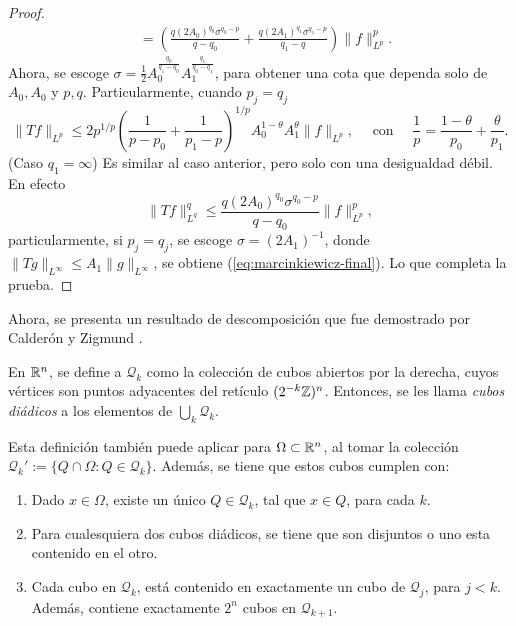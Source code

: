 \begin{proof}
\begin{align*}
		& = \left(\frac{q(2A_0)^{q_0}\sigma^{q_0-p}}{q-q_0} +\frac{q(2A_1)^{q_1}\sigma^{q_1-p}}{q_1-q} \right) \|f\|_{L^p}^p.
	\end{align*}
	Ahora, se escoge $\sigma=\frac{1}{2}A_0^{\frac{q_0}{q_1-q_0}}A_1^{\frac{q_1}{q_0-q_1}}$, para obtener una cota que dependa solo de $A_0,A_0$ y $p,q$. Particularmente, cuando $p_j =q_j$
	\begin{equation}\label{eq:marcinkiewicz-final}
		\|Tf\|_{L^p} \leq 2p^{1/p}\left(\frac{1}{p-p_0}+\frac{1}{p_1-p}\right)^{1/p}A_0^{1-\theta}A_1^\theta\|f\|_{L^p}, \quad \text{ con }\quad \frac{1}{p} = \frac{1-\theta}{p_0} + \frac{\theta}{p_1}.
	\end{equation}
	(Caso $q_1=\infty$) Es similar al caso anterior, pero solo con una desigualdad débil. En efecto 
	\begin{equation*}
		\|Tf\|_{L^q}^q \leq \frac{q(2A_0)^{q_0}\sigma^{q_0-p}}{q-q_0} \|f\|_{L^p}^p,
	\end{equation*}
	particularmente, si $p_j=q_j$, se escoge $\sigma = (2A_1)^{-1}$, donde $\|Tg\|_{L^\infty}\leq A_1\|g\|_{L^\infty}$, se obtiene (\ref{eq:marcinkiewicz-final}). Lo que completa la prueba.
\end{proof}
Ahora, se presenta un resultado de descomposición que fue demostrado por Calderón y Zigmund \cite{calderon-zygmund}.
\begin{definition}
	En $\mathbb{R}^n$, se define a $\mathcal{Q}_k$ como la colección de cubos abiertos por la derecha, cuyos vértices son puntos adyacentes del retículo $(2^{-k}\mathbb{Z})^n$. Entonces, se les llama \textit{cubos diádicos} a los elementos de $\bigcup_k \mathcal{Q}_k$.
\end{definition}
\begin{remark}
	Esta definición también puede aplicar para $\Omega\subset\mathbb{R}^n$, al tomar la colección $\mathcal{Q}_k' := \{Q\cap\Omega: Q\in\mathcal{Q}_k\}$. Además, se tiene que estos cubos cumplen con:
	\begin{enumerate}
		\item Dado $x\in\Omega$, existe un único $Q\in\mathcal{Q}_k$, tal que $x\in Q$, para cada $k$. 
		\item Para cualesquiera dos cubos diádicos, se tiene que son disjuntos o uno esta contenido en el otro. 
		\item Cada cubo en $\mathcal{Q}_k$, está contenido en exactamente un cubo de $\mathcal{Q}_j$, para $j<k$. Además, contiene exactamente $2^n$ cubos en $\mathcal{Q}_{k+1}$.
	\end{enumerate}
\end{remark}
